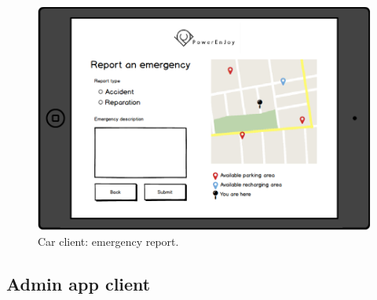 	\begin{figure}[h]
		\includegraphics[height=0.4\textheight, center]{img/user_interface_design/Car_emergency_report.png}
		\caption{Car client: emergency report.}
	\end{figure}

\subsection{Admin app client}

\FloatBarrier